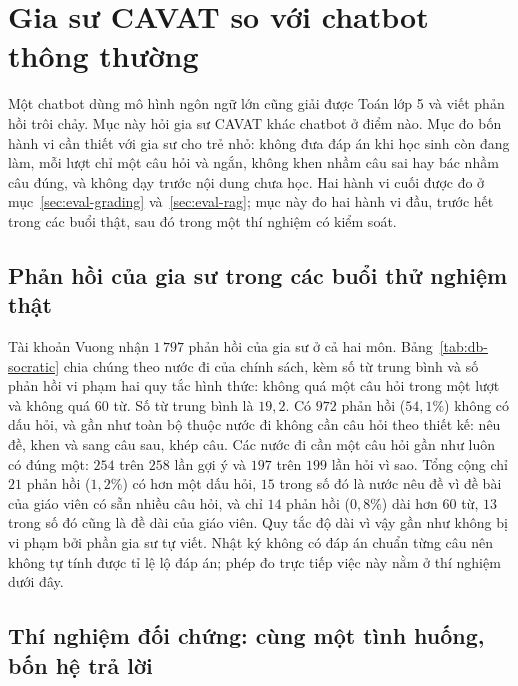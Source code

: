 \section{Gia sư CAVAT so với chatbot thông thường}\label{sec:eval-socratic}

Một chatbot dùng mô hình ngôn ngữ lớn cũng giải được Toán lớp 5 và viết phản hồi trôi chảy. Mục này hỏi gia sư CAVAT khác chatbot ở điểm nào. Mục đo bốn hành vi cần thiết với gia sư cho trẻ nhỏ: không đưa đáp án khi học sinh còn đang làm, mỗi lượt chỉ một câu hỏi và ngắn, không khen nhầm câu sai hay bác nhầm câu đúng, và không dạy trước nội dung chưa học. Hai hành vi cuối được đo ở mục~\ref{sec:eval-grading} và~\ref{sec:eval-rag}; mục này đo hai hành vi đầu, trước hết trong các buổi thật, sau đó trong một thí nghiệm có kiểm soát.

\subsection{Phản hồi của gia sư trong các buổi thử nghiệm thật}
Tài khoản Vuong nhận $1\,797$ phản hồi của gia sư ở cả hai môn. Bảng~\ref{tab:db-socratic} chia chúng theo nước đi của chính sách, kèm số từ trung bình và số phản hồi vi phạm hai quy tắc hình thức: không quá một câu hỏi trong một lượt và không quá $60$ từ. Số từ trung bình là $19{,}2$. Có $972$ phản hồi ($54{,}1\%$) không có dấu hỏi, và gần như toàn bộ thuộc nước đi không cần câu hỏi theo thiết kế: nêu đề, khen và sang câu sau, khép câu. Các nước đi cần một câu hỏi gần như luôn có đúng một: $254$ trên $258$ lần gợi ý và $197$ trên $199$ lần hỏi vì sao. Tổng cộng chỉ $21$ phản hồi ($1{,}2\%$) có hơn một dấu hỏi, $15$ trong số đó là nước nêu đề vì đề bài của giáo viên có sẵn nhiều câu hỏi, và chỉ $14$ phản hồi ($0{,}8\%$) dài hơn $60$ từ, $13$ trong số đó cũng là đề dài của giáo viên. Quy tắc độ dài vì vậy gần như không bị vi phạm bởi phần gia sư tự viết. Nhật ký không có đáp án chuẩn từng câu nên không tự tính được tỉ lệ lộ đáp án; phép đo trực tiếp việc này nằm ở thí nghiệm dưới đây.



\subsection{Thí nghiệm đối chứng: cùng một tình huống, bốn hệ trả lời}
